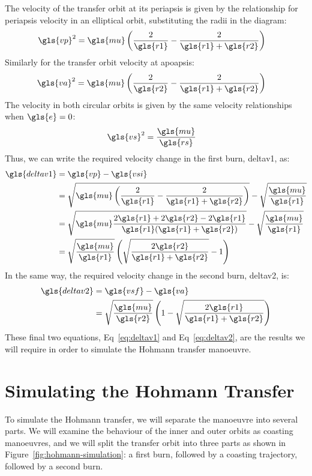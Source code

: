 \documentclass[12pt,openany]{book}
\begin{document}
The velocity of the transfer orbit at its periapsis is given by the relationship for periapsis velocity in an elliptical orbit, substituting the radii in the diagram:
\begin{align}
  \gls{vp}^2 &= \gls{mu}\left(\frac{2}{\gls{r1}}-\frac{2}{\gls{r1}+\gls{r2}}\right)
\end{align}
Similarly for the transfer orbit velocity at apoapsis:
\begin{align}
  \gls{va}^2 &= \gls{mu}\left(\frac{2}{\gls{r2}}-\frac{2}{\gls{r1}+\gls{r2}}\right)
\end{align}
The velocity in both circular orbits is given by the same velocity relationships when \(\gls{e} = 0\):
\begin{align}
  \gls{vs}^2 &= \frac{\gls{mu}}{\gls{rs}}
\end{align}
Thus, we can write the required velocity change in the first burn, \gls{deltav1}, as:
\begin{align}
  \gls{deltav1} &= \gls{vp} - \gls{vsi} \\
  &= \sqrt{\gls{mu}\left(\frac{2}{\gls{r1}}-\frac{2}{\gls{r1}+\gls{r2}}\right)}
  - \sqrt{\frac{\gls{mu}}{\gls{r1}}}\\
  &= \sqrt{
    \gls{mu}
    \frac{2\gls{r1}+2\gls{r2}-2\gls{r1}}{\gls{r1}(\gls{r1}+\gls{r2})}
    }
  - \sqrt{\frac{\gls{mu}}{\gls{r1}}}\\
  &= \sqrt{\frac{\gls{mu}}{\gls{r1}}}
  \left(
  \sqrt{\frac{2\gls{r2}}{\gls{r1}+\gls{r2}}} - 1
  \right) \label{eq:deltav1}
\end{align}
In the same way, the required velocity change in the second burn, \gls{deltav2}, is:
\begin{align}
  \gls{deltav2} &= \gls{vsf} - \gls{va} \\
  &= \sqrt{\frac{\gls{mu}}{\gls{r2}}}
  \left(
  1 - \sqrt{\frac{2\gls{r1}}{\gls{r1}+\gls{r2}}}
  \right) \label{eq:deltav2}
\end{align}
These final two equations, Eq~\ref{eq:deltav1} and Eq~\ref{eq:deltav2}, are the results we will require in order to simulate the Hohmann transfer manoeuvre.

\section{Simulating the Hohmann Transfer}

To simulate the Hohmann transfer, we will separate the manoeuvre into several parts. We will examine the behaviour of the inner and outer orbits as coasting manoeuvres, and we will split the transfer orbit into three parts as shown in Figure~\ref{fig:hohmann-simulation}: a first burn, followed by a coasting trajectory, followed by a second burn.
\end{document}

